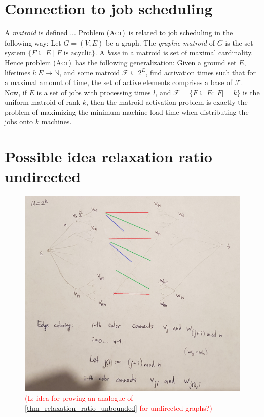 \documentclass[10pt,a4paper]{article}
\numberwithin{equation}{section}
\newcommand{\N}{\mathbb{N}}
\newcommand{\set}[1]{\{ #1 \}}
\newcommand{\comment}[1]{\textcolor{red}{(L: #1)}}
\newcommand{\act}{\textsc{(Act)}}
\begin{document}
\section{Connection to job scheduling}
\label{appendix:connection_act_job_scheduling}
A \emph{matroid} is defined ...
Problem \act\ is related to job scheduling in the following way: Let $G = (V, E)$ be a graph. The \emph{graphic matroid} of $G$ is the set system $\set{F \subseteq E \mid F \text{ is acyclic}}$. A \emph{base} in a matroid is set of maximal cardinality. Hence problem \act\ has the following generalization: Given a ground set $E$, lifetimes $l: E \rightarrow \N$, and some matroid $\mathcal{F} \subseteq 2^E$, find activation times such that for a maximal amount of time, the set of active elements comprises a base of $\mathcal{F}$. Now, if $E$ is a set of jobs with processing times $l$, and $\mathcal{F} = \set{F \subseteq E : |F| = k}$ is the uniform matroid of rank $k$, then the matroid activation problem is exactly the problem of maximizing the minimum machine load time when distributing the jobs onto $k$ machines.

\section{Possible idea relaxation ratio undirected}

\begin{figure}[htpb]
\centering
\includegraphics[width=\textwidth]{img/idea_undirected_approximation_ratio.jpg}
\caption{\comment{idea for proving an analogue of \cref{thm_relaxation_ratio_unbounded} for undirected graphs?}}
\label{fig_undirected_relaxation_ratio}
\end{figure}
\end{document}
